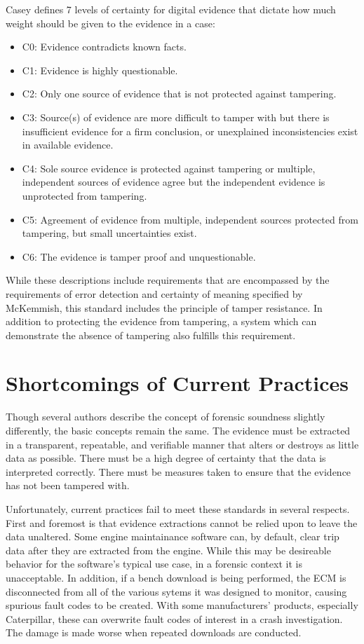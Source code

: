 Casey \cite{casey2002} defines 7 levels of certainty for digital evidence that dictate how much weight should be given to the evidence in a case:

\begin{itemize}
\item C0: Evidence contradicts known facts.
\item C1: Evidence is highly questionable.
\item C2: Only one source of evidence that is not protected against tampering.
\item C3: Source(s) of evidence are more difficult to tamper with but there is insufficient evidence for a firm conclusion, or unexplained inconsistencies exist in available evidence.
\item C4: Sole source evidence is protected against tampering or multiple, independent sources of evidence agree but the independent evidence is unprotected from tampering.
\item C5: Agreement of evidence from multiple, independent sources protected from tampering, but small uncertainties exist.
\item C6: The evidence is tamper proof and unquestionable.
\end{itemize}

While these descriptions include requirements that are encompassed by the requirements of error detection and certainty of meaning 
specified by McKemmish, this standard includes the principle of tamper resistance. In addition to protecting the evidence from tampering, 
a system which can demonstrate the absence of tampering also fulfills this requirement.

\section{Shortcomings of Current Practices}

Though several authors describe the concept of forensic soundness slightly differently, the basic concepts remain the same. The evidence must be extracted in a transparent,
repeatable, and verifiable manner that alters or destroys as little data as possible. There must be a high degree of certainty that the data is interpreted correctly. There must
be measures taken to ensure that the evidence has not been tampered with.

Unfortunately, current practices fail to meet these standards in several respects. 
First and foremost is that evidence extractions cannot be relied upon to leave the data unaltered.
Some engine maintainance software can, by default, clear trip data after they are extracted from the engine. While this may be desireable behavior for the software's typical
use case, in a forensic context it is unacceptable. In addition, if a bench download is being performed, the ECM is disconnected from all of the various sytems it was designed to monitor,
causing spurious fault codes to be created. With some manufacturers' products, especially Caterpillar, these can overwrite fault codes of interest in a crash investigation. 
The damage is made worse when repeated downloads are conducted.

